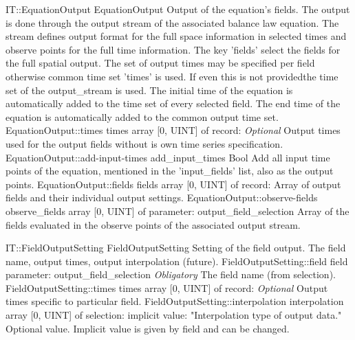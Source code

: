 \begin{RecordType}
	{IT::EquationOutput}
	{EquationOutput}
	{}%
	{}%
	{{{Output of the equation's fields.
The output is done through the output stream of the associated balance law equation.
The stream defines output format for the full space information in selected times and observe points for the full time information.
The key 'fields' select the fields for the full spatial output.
The set of output times may be specified  per field otherwise common time set 'times' is used.
If even this is not providedthe time set of the output{\_}stream is used.
The initial time of the equation is automatically added to the time set of every selected field.
The end time of the equation is automatically added to the common output time set.}%
}}
		\RecKey
			{EquationOutput::times}
			{times}
			{{array [0, UINT] of }{record: }}{}
			{ \it{Optional}}
			{{{Output times used for the output fields without is own time series specification.}%
}}
		\RecKey
			{EquationOutput::add-input-times}
			{add{\_}input{\_}times}
			{{Bool}}{}
			{ }
			{{{Add all input time points of the equation, mentioned in the 'input{\_}fields' list, also as the output points.}%
}}
		\RecKey
			{EquationOutput::fields}
			{fields}
			{{array [0, UINT] of }{record: }}{}
			{ \ValueDefault{[]}}
			{{{Array of output fields and their individual output settings.}%
}}
		\RecKey
			{EquationOutput::observe-fields}
			{observe{\_}fields}
			{{array [0, UINT] of }{parameter: output{\_}field{\_}selection}}{}
			{ \ValueDefault{[]}}
			{{{Array of the fields evaluated in the observe points of the associated output stream.}%
}}
\end{RecordType}
\begin{RecordType}
	{IT::FieldOutputSetting}
	{FieldOutputSetting}
	{}%
	{}%
	{{{Setting of the field output.
The field name, output times, output interpolation (future).}%
}}
		\RecKey
			{FieldOutputSetting::field}
			{field}
			{{parameter: output{\_}field{\_}selection}}{}
			{ \it{Obligatory}}
			{{{The field name (from selection).}%
}}
		\RecKey
			{FieldOutputSetting::times}
			{times}
			{{array [0, UINT] of }{record: }}{}
			{ \it{Optional}}
			{{{Output times specific to particular field.}%
}}
		\RecKey
			{FieldOutputSetting::interpolation}
			{interpolation}
			{{array [0, UINT] of }{selection: }}{}
			{implicit value: "{Interpolation type of output data.}"}
			{{{Optional value.
Implicit value is given by field and can be changed.}%
}}
\end{RecordType}
